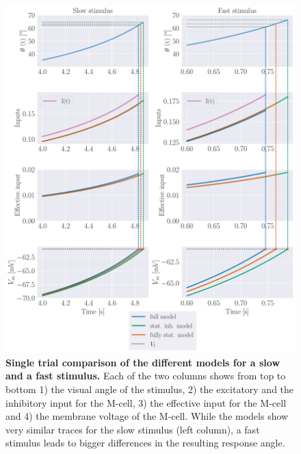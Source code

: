 \documentclass[a4paper,10pt,hidelinks]{scrreprt}
\begin{document}
     \begin{figure}[H]
    	\begin{center}
			\includegraphics[width=\textwidth]{figure_voltage_traces.pdf}
    	\end{center}
    	\caption{\textbf{Single trial comparison of the different models for a slow and a fast stimulus.} Each of the two columns shows from top to bottom 1) the visual angle of the stimulus, 2) the excitatory and the inhibitory input for the M-cell, 3) the effective input for the M-cell and 4) the membrane voltage of the M-cell. While the models show very similar traces for the slow stimulus (left column), a fast stimulus leads to bigger differences in the resulting response angle.}
    	\label{fig:voltage_traces}
    \end{figure}
    
\end{document}

